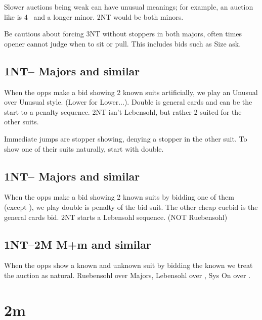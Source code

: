 \documentclass[tom-ari]{subfile}
\begin{document}
	Slower auctions being weak can have unusual meanings; for example, an auction like  is 4 \spadesuit ~and a longer minor. 2NT would be both minors. 
	
	Be cautious about forcing 3NT without stoppers in both majors, often times opener cannot judge when to sit or pull. This includes bids such as  Size ask. 

	\subsection{1NT-- Majors and similar}
	
	When the opps make a bid showing 2 known suits artificially, we play an Unusual over Unusual style. (Lower for Lower...). Double is general cards and can be the start to a penalty sequence. 2NT isn't Lebensohl, but rather 2 suited for the other suits.
	
	Immediate jumps are stopper showing, denying a stopper in the other suit. To show one of their suits naturally, start with double.
	
	\subsection{1NT-- Majors and similar}
	
	When the opps make a bid showing 2 known suits by bidding one of them (except ), we play double is penalty of the bid suit. The other cheap cuebid is the general cards bid. 2NT starts a Lebensohl sequence. (NOT Ruebensohl)
	
	
	\subsection{1NT--2M M+m and similar}
	
	When the opps show a known and unknown suit by bidding the known we treat the auction as natural. Ruebensohl over Majors, Lebensohl over \diamondsuit, Sys On over \clubsuit.

	
	\section{2m}
	
\end{document}
